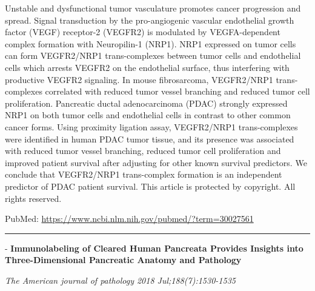 \documentclass[]{article}
\begin{document}
Unstable and dysfunctional tumor vasculature promotes cancer progression
and spread. Signal transduction by the pro-angiogenic vascular
endothelial growth factor (VEGF) receptor-2 (VEGFR2) is modulated by
VEGFA-dependent complex formation with Neuropilin-1 (NRP1). NRP1
expressed on tumor cells can form VEGFR2/NRP1 trans-complexes between
tumor cells and endothelial cells which arrests VEGFR2 on the
endothelial surface, thus interfering with productive VEGFR2 signaling.
In mouse fibrosarcoma, VEGFR2/NRP1 trans-complexes correlated with
reduced tumor vessel branching and reduced tumor cell proliferation.
Pancreatic ductal adenocarcinoma (PDAC) strongly expressed NRP1 on both
tumor cells and endothelial cells in contrast to other common cancer
forms. Using proximity ligation assay, VEGFR2/NRP1 trans-complexes were
identified in human PDAC tumor tissue, and its presence was associated
with reduced tumor vessel branching, reduced tumor cell proliferation
and improved patient survival after adjusting for other known survival
predictors. We conclude that VEGFR2/NRP1 trans-complex formation is an
independent predictor of PDAC patient survival. This article is
protected by copyright. All rights reserved.

PubMed: \url{https://www.ncbi.nlm.nih.gov/pubmed/?term=30027561}

{}

{}

\begin{center}\rule{0.5\linewidth}{\linethickness}\end{center}

 - \textbf{Immunolabeling of Cleared Human Pancreata Provides Insights
into Three-Dimensional Pancreatic Anatomy and Pathology}

\emph{The American journal of pathology 2018 Jul;188(7):1530-1535}
\end{document}
